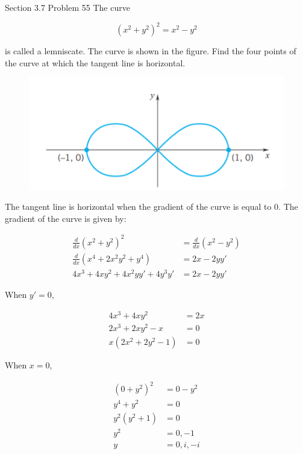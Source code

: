 \documentclass{article}
\begin{document}
    \begin{tbhtheorem}{Section 3.7 Problem 55}
        The curve

        \[
            (x^2 + y^2) ^2 = x^2 - y^2
        \]

        is called a lemniscate. The curve is shown in the figure. Find the four points of the curve at which the tangent line is horizontal.
    \end{tbhtheorem}

    \begin{figure}[hbt!]
        \centering
        \includegraphics[]{Homework3_Fig3}
    \end{figure}

    The tangent line is horizontal when the gradient of the curve is equal to 0. The gradient of the curve is given by:

    \begin{align*}
        \frac{d}{dx} (x^2+y^2)^2    &= \frac{d}{dx} (x^2-y^2) \\
        \frac{d}{dx} (x^4 + 2x^2 y^2 + y^4) &= 2x - 2yy' \\
        4x^3  + 4xy^2 + 4x^2 y y' + 4y^3 y' &= 2x - 2yy'
    \end{align*}

    When $y'=0$,

    \begin{align*}
        4x^3 + 4xy^2        &= 2x \\
        2x^3 + 2xy^2 - x    &= 0 \\
        x(2x^2 + 2y^2 -1)   &= 0
    \end{align*}

    When $x=0$,

    \begin{align*}
        (0+y^2)^2   &= 0 - y^2 \\
        y^4 + y^2   &= 0 \\
        y^2(y^2 + 1)    &= 0 \\
        y^2             &= 0, -1 \\
        y               &= 0, i, -i
    \end{align*}
\end{document}
